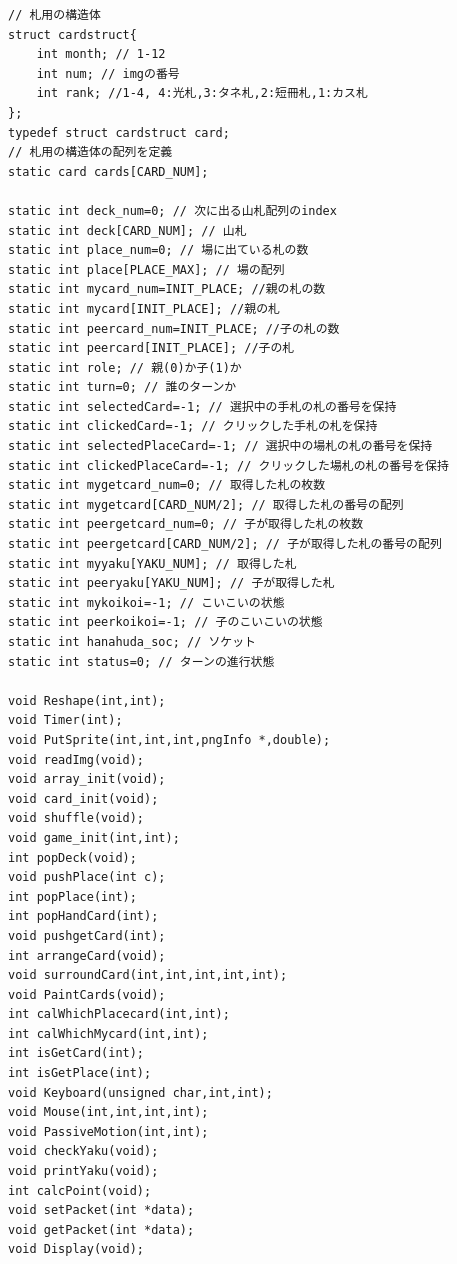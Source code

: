 \documentclass[a4j]{jarticle}
\begin{document}
\begin{lstlisting}[basicstyle=\ttfamily\footnotesize, frame=single,label=hanahudah,caption=hanahuda.h]
// 札用の構造体
struct cardstruct{
    int month; // 1-12
    int num; // imgの番号
    int rank; //1-4, 4:光札,3:タネ札,2:短冊札,1:カス札
};
typedef struct cardstruct card;
// 札用の構造体の配列を定義
static card cards[CARD_NUM];

static int deck_num=0; // 次に出る山札配列のindex
static int deck[CARD_NUM]; // 山札
static int place_num=0; // 場に出ている札の数
static int place[PLACE_MAX]; // 場の配列
static int mycard_num=INIT_PLACE; //親の札の数
static int mycard[INIT_PLACE]; //親の札
static int peercard_num=INIT_PLACE; //子の札の数
static int peercard[INIT_PLACE]; //子の札 
static int role; // 親(0)か子(1)か
static int turn=0; // 誰のターンか
static int selectedCard=-1; // 選択中の手札の札の番号を保持
static int clickedCard=-1; // クリックした手札の札を保持 
static int selectedPlaceCard=-1; // 選択中の場札の札の番号を保持
static int clickedPlaceCard=-1; // クリックした場札の札の番号を保持
static int mygetcard_num=0; // 取得した札の枚数
static int mygetcard[CARD_NUM/2]; // 取得した札の番号の配列
static int peergetcard_num=0; // 子が取得した札の枚数
static int peergetcard[CARD_NUM/2]; // 子が取得した札の番号の配列
static int myyaku[YAKU_NUM]; // 取得した札
static int peeryaku[YAKU_NUM]; // 子が取得した札
static int mykoikoi=-1; // こいこいの状態
static int peerkoikoi=-1; // 子のこいこいの状態
static int hanahuda_soc; // ソケット
static int status=0; // ターンの進行状態

void Reshape(int,int);
void Timer(int);
void PutSprite(int,int,int,pngInfo *,double);
void readImg(void);
void array_init(void);
void card_init(void);
void shuffle(void);
void game_init(int,int);
int popDeck(void);
void pushPlace(int c);
int popPlace(int);
int popHandCard(int);
void pushgetCard(int);
int arrangeCard(void);
void surroundCard(int,int,int,int,int);
void PaintCards(void);
int calWhichPlacecard(int,int);
int calWhichMycard(int,int);
int isGetCard(int);
int isGetPlace(int);
void Keyboard(unsigned char,int,int);
void Mouse(int,int,int,int);
void PassiveMotion(int,int);
void checkYaku(void);
void printYaku(void);
int calcPoint(void);
void setPacket(int *data);
void getPacket(int *data);
void Display(void);
    \end{lstlisting}
\end{document}
